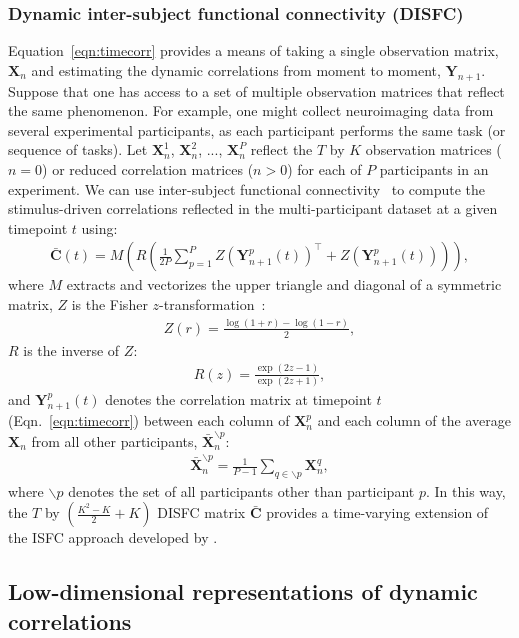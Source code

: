 \documentclass[english]{article}
\begin{document}
\subsubsection*{Dynamic inter-subject functional connectivity (DISFC)}
Equation~\ref{eqn:timecorr} provides a means of taking a single
observation matrix, $\mathbf{X}_n$ and estimating the dynamic
correlations from moment to moment, $\mathbf{Y}_{n+1}$.  Suppose that
one has access to a set of multiple observation matrices that reflect
the same phenomenon.  For example, one might collect neuroimaging data
from several experimental participants, as each participant performs
the same task (or sequence of tasks).  Let $\mathbf{X}_n^1$,
$\mathbf{X}_n^2$, ..., $\mathbf{X}_n^P$ reflect the $T$ by $K$
observation matrices ($n = 0$) or reduced correlation matrices
($n > 0$) for each of $P$ participants in an experiment.  We can use
inter-subject functional connectivity~\citep[ISFC;
][]{SimoEtal16, SimoChan20} to compute the stimulus-driven correlations reflected
in the multi-participant dataset at a given timepoint $t$ using:
\begin{align}
\bar{\mathbf{C}}(t) = M\left(R\left(\frac{1}{2P} \sum_{p=1}^P
  Z\left(\mathbf{Y}_{n+1}^p(t)\right)^\top + Z\left(\mathbf{Y}_{n+1}^p(t)\right)\right)\right),\label{eqn:disfc}
\end{align}
where $M$ extracts and vectorizes the upper triangle and diagonal of a symmetric
matrix, $Z$ is the Fisher $z$-transformation~\citep{Zar10}:
\begin{align}
Z(r) = \frac{\log(1+r) - \log(1-r)}{2},
\end{align}
$R$ is the inverse of $Z$:
\begin{align}
R(z) = \frac{\exp(2z - 1)}{\exp(2z + 1)},
\end{align}
and $\mathbf{Y}_{n+1}^p(t)$ denotes the correlation matrix at timepoint $t$
(Eqn.~\ref{eqn:timecorr}) between each column of $\mathbf{X}_n^p$ and each
column of the average $\mathbf{X}_n$ from all other
participants, $\bar{\mathbf{X}}_n^{ \backslash p}$:
\begin{align}
  \bar{\mathbf{X}}_n^{ \backslash p} = \frac{1}{P-1}\sum_{q \in
  \backslash p} \mathbf{X}_n^q,
\end{align}
where $\backslash p$ denotes the set of all participants other than
participant $p$. In this way, the $T$ by $\left( \frac{K^2 - K}{2} + K \right)$ DISFC
matrix $\bar{\mathbf{C}}$ provides a time-varying extension of the ISFC
approach developed by \cite{SimoEtal16}.

\subsection*{Low-dimensional representations of dynamic
  correlations}
\end{document}
